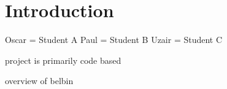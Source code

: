
\section{Introduction}\label{sec:introduction}

Oscar = Student A
Paul = Student B
Uzair = Student C

project is primarily code based

overview of belbin